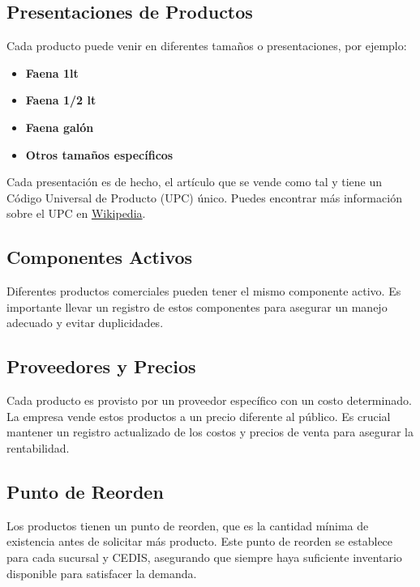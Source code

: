 \documentclass[
  letterpaper,
  DIV=11,
  numbers=noendperiod]{scrreprt}
\providecommand{\tightlist}{%
  \setlength{\itemsep}{0pt}\setlength{\parskip}{0pt}}\usepackage{longtable,booktabs,array}
\begin{document}
\subsection{Presentaciones de
Productos}\label{presentaciones-de-productos}

Cada producto puede venir en diferentes tamaños o presentaciones, por
ejemplo:

\begin{itemize}
\tightlist
\item
  \textbf{Faena 1lt}
\item
  \textbf{Faena 1/2 lt}
\item
  \textbf{Faena galón}
\item
  \textbf{Otros tamaños específicos}
\end{itemize}

Cada presentación es de hecho, el artículo que se vende como tal y tiene
un Código Universal de Producto (UPC) único. Puedes encontrar más
información sobre el UPC en
\href{https://es.wikipedia.org/wiki/C\%C3\%B3digo_Universal_de_Producto}{Wikipedia}.

\subsection{Componentes Activos}\label{componentes-activos}

Diferentes productos comerciales pueden tener el mismo componente
activo. Es importante llevar un registro de estos componentes para
asegurar un manejo adecuado y evitar duplicidades.

\subsection{Proveedores y Precios}\label{proveedores-y-precios}

Cada producto es provisto por un proveedor específico con un costo
determinado. La empresa vende estos productos a un precio diferente al
público. Es crucial mantener un registro actualizado de los costos y
precios de venta para asegurar la rentabilidad.

\subsection{Punto de Reorden}\label{punto-de-reorden}

Los productos tienen un punto de reorden, que es la cantidad mínima de
existencia antes de solicitar más producto. Este punto de reorden se
establece para cada sucursal y CEDIS, asegurando que siempre haya
suficiente inventario disponible para satisfacer la demanda.
\end{document}
